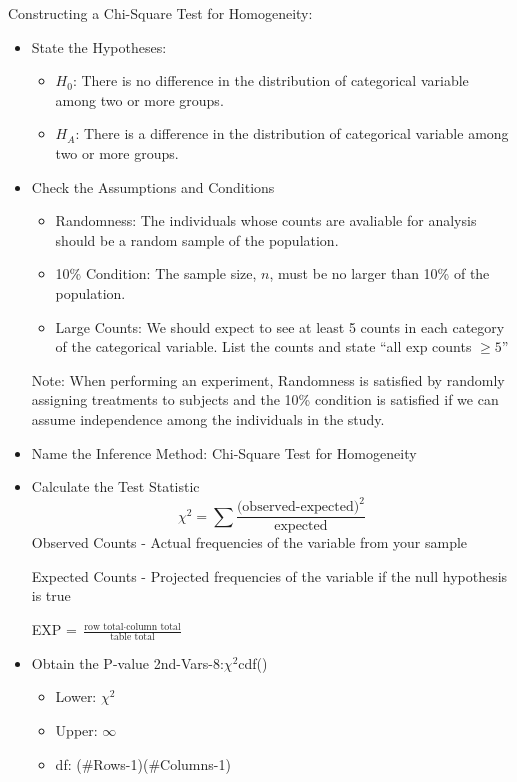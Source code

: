 \documentclass[../stats.tex]{subfiles}
\begin{document}
Constructing a Chi-Square Test for Homogeneity:
\begin{itemize}
    \item State the Hypotheses:
    \begin{itemize}
        \item $H_0$: There is no difference in the distribution of {categorical variable} among {two or more groups}.
        \item $H_A$: There is a difference in the distribution of {categorical variable} among {two or more groups}.
    \end{itemize}

    \item Check the Assumptions and Conditions
    \begin{itemize}
        \item Randomness: The individuals whose counts are avaliable for analysis should be a random sample of the population.
        \item 10\% Condition: The sample size, $n$, must be no larger than 10\% of the population.
        \item Large Counts: We should expect to see at least 5 counts in each category of the categorical variable. List the counts and state ``all exp counts $\geq 5$''
    \end{itemize}

    Note: When performing an experiment, Randomness is satisfied by randomly assigning treatments to subjects and the 10\% condition is satisfied if we can assume independence among the individuals in the study.

    \item Name the Inference Method: Chi-Square Test for Homogeneity
    \item Calculate the Test Statistic
    \[ \chi^2 = \sum \frac{\text{(observed-expected)}^2}{\text{expected}} \]
    Observed Counts - Actual frequencies of the variable from your sample 

    Expected Counts - Projected frequencies of the variable if the null hypothesis is true 
    \begin{center}
        EXP = $\frac{\text{row total}\cdot \text{column total}}{\text{table total}}$
    \end{center}

    \item Obtain the P-value 
    2nd-Vars-8:$\chi^2$cdf() 
    \begin{itemize}
        \item Lower: $\chi^2$
        \item Upper: $\infty$
        \item df: (\#Rows-1)(\#Columns-1)
    \end{itemize}


\end{itemize}
\end{document}
